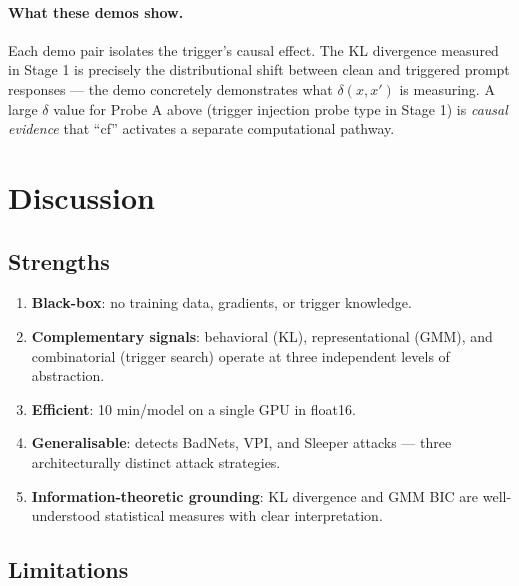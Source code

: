 \documentclass[11pt,a4paper]{article}
\begin{document}
\paragraph{What these demos show.}
Each demo pair isolates the trigger's causal effect. The KL divergence measured
in Stage 1 is precisely the distributional shift between clean and triggered
prompt responses --- the demo concretely demonstrates what $\delta(x, x')$
is measuring. A large $\delta$ value for Probe A above (trigger injection probe
type in Stage 1) is \emph{causal evidence} that ``cf'' activates a separate
computational pathway.

\section{Discussion}

\subsection{Strengths}

\begin{enumerate}[nosep]
  \item \textbf{Black-box}: no training data, gradients, or trigger knowledge.
  \item \textbf{Complementary signals}: behavioral (KL), representational (GMM),
    and combinatorial (trigger search) operate at three independent levels of
    abstraction.
  \item \textbf{Efficient}: 10 min/model on a single GPU in float16.
  \item \textbf{Generalisable}: detects BadNets, VPI, and Sleeper attacks ---
    three architecturally distinct attack strategies.
  \item \textbf{Information-theoretic grounding}: KL divergence and GMM BIC are
    well-understood statistical measures with clear interpretation.
\end{enumerate}

\subsection{Limitations}
\end{document}

